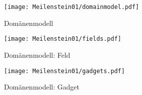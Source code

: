 \FloatBarrier
\begin{figure}[h]
    \centering
    \texttt{[image: Meilenstein01/domainmodel.pdf]}
    \caption{Domänenmodell}
\end{figure}

\FloatBarrier

\begin{figure}[h]
    \centering
    \texttt{[image: Meilenstein01/fields.pdf]}
    \caption{Domänenmodell: Feld}
\end{figure}
\FloatBarrier


\begin{figure}[h]
    \centering
    \texttt{[image: Meilenstein01/gadgets.pdf]}
    \caption{Domänenmodell: Gadget}
\end{figure}
\FloatBarrier

